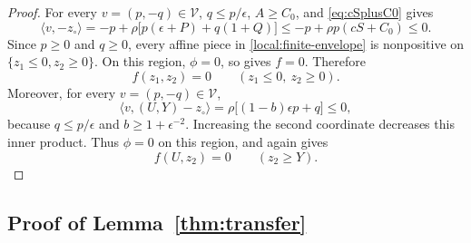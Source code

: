 \documentclass[11pt,letterpaper]{article}
\theoremstyle{definition}
\begin{document}
\begin{proof}
For every $v=(p,-q)\in\mathcal V$, $q\le p/\epsilon$, $A\geq C_0$, and \eqref{eq:cSplusC0} gives
\[
  \langle v,-z_\circ\rangle
  =-p+\rho\bigl[p(\epsilon+P)+q(1+Q)\bigr]
  \le-p+\rho p(cS+C_0)\le0.
\]
Since $p\ge0$ and $q\ge0$, every affine piece in \eqref{local:finite-envelope} is nonpositive on $\{z_1\le0,z_2\ge0\}$.
On this region, $\phi=0$, so  gives $f=0$.
Therefore
\begin{equation*}
  f(z_1,z_2)=0\qquad(z_1\le0,\ z_2\ge0).
\end{equation*}
Moreover, for every $v=(p,-q)\in\mathcal V$,
\[
  \langle v,(U,Y)-z_\circ\rangle
  =\rho\bigl[(1-b)\epsilon p+q\bigr]\le0,
\]
because $q\le p/\epsilon$ and $b\ge1+\epsilon^{-2}$.
Increasing the second coordinate decreases this inner product.
Thus $\phi=0$ on this region, and  again gives
\begin{equation*}
  f(U,z_2)=0\qquad(z_2\ge Y).
\end{equation*}


\end{proof}

\subsection{Proof of Lemma~\ref{thm:transfer}}
\label{local:app-chain}
\end{document}
